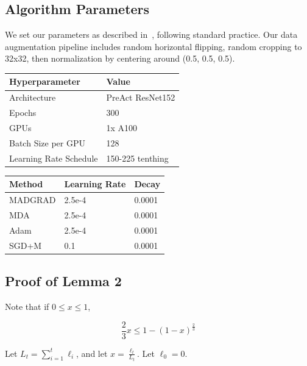 \documentclass{article}
\begin{document}
\subsection{Algorithm Parameters}\label{algoparams}

We set our parameters as described in~\cite{defazio_adaptivity_nodate}, following standard practice. Our data
augmentation pipeline includes random horizontal flipping, random cropping to 32x32, then normalization by centering
around (0.5, 0.5, 0.5).

\begin{center}
  \begin{tabular}{ | l | l | }
  \hline
  \textbf{Hyperparameter} & \textbf{Value} \\
  \hline
  Architecture & PreAct ResNet152 \\
  \hline
  Epochs & 300 \\
  \hline
  GPUs & 1x A100 \\
  \hline
  Batch Size per GPU & 128 \\
  \hline
  Learning Rate Schedule & 150-225 tenthing \\
  \hline
\end{tabular}
\end{center}

\begin{center}
  \begin{tabular}{ | l | l | l |}
    \hline
    Method & Learning Rate & Decay \\
    \hline
    MADGRAD & 2.5e-4 & 0.0001 \\
    \hline
    MDA & 2.5e-4 & 0.0001 \\
    \hline
    Adam & 2.5e-4 & 0.0001 \\
    \hline
    SGD+M & 0.1 & 0.0001 \\
    \hline
  \end{tabular}
\end{center}

\subsection{Proof of Lemma 2}\label{lemmaproof:2}

\firstbound*

\proof Note that if $0 \leq x \leq 1$, 

\[
  \frac{2}{3} x \leq 1 - (1 - x)^\frac{2}{3}
\]

Let $L_t = \sum\limits_{i=1}^t \ell_i$, and let $x = \frac{\ell_t}{L_t}$. Let $\ell_0 = 0$.
\end{document}
